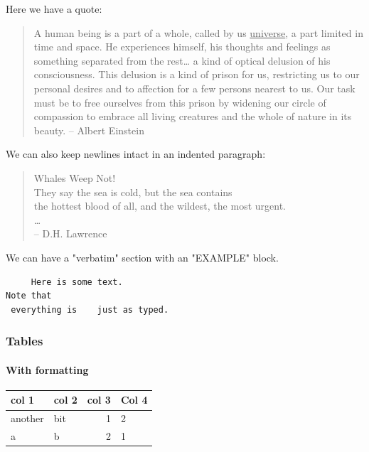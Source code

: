 \documentclass[11pt]{article}
\begin{document}
Here we have a quote:
\begin{quote}
A human being is a part of a whole, called by us \uline{universe}, a part limited in time and space. He experiences himself, his thoughts and feelings as something
separated from the rest\ldots{} a kind of optical delusion of his consciousness. This delusion is a kind of prison for us, restricting us to our personal desires
and to affection for a few persons nearest to us. Our task must be to free ourselves from this prison by widening our circle of compassion to embrace all
living creatures and the whole of nature in its beauty. -- Albert Einstein
\end{quote}

We can also keep newlines intact in an indented paragraph:
\begin{verse}
Whales Weep Not!\\
\vspace*{1em}
They say the sea is cold, but the sea contains\\
the hottest blood of all, and the wildest, the most urgent.\\
\ldots{}\\
\vspace*{1em}
\hspace*{3em}-- D.H. Lawrence\\
\end{verse}

We can have a "verbatim" section with an "EXAMPLE" block.
\begin{verbatim}
     Here is some text.
Note that
 everything is    just as typed.
\end{verbatim}

\subsubsection{Tables}
\label{sec:org43008b7}

\paragraph{With formatting}
\label{sec:orgd70b689}

\begin{center}
\begin{tabular}{l|l|rl}
\hline
col 1 & col 2 & col 3 & Col 4\\
\hline
another & bit & 1 & 2\\
a & b & 2 & 1\\
\hline
\end{tabular}
\end{center}
\end{document}
